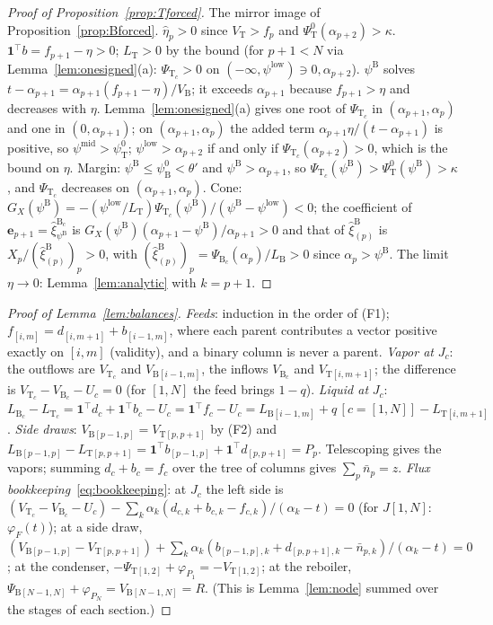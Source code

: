 \documentclass[11pt,a4paper]{report}
\newcommand{\one}{\mathbf 1}
\newcommand{\bfe}{\mathbf e}
\newcommand{\Ts}{\mathrm T}
\newcommand{\Bs}{\mathrm B}
\begin{document}
\begin{proof}[Proof of Proposition~\ref{prop:Tforced}]
The mirror image of Proposition~\ref{prop:Bforced}. \(\hat\eta_p>0\) since \(V_\Ts>f_p\) and \(\Psi^0_\Ts(\alpha_{p+2})>\kappa\).
\(\one^\top b=f_{p+1}-\eta>0\); \(L_\Ts>0\) by the bound (for \(p+1<N\) via Lemma~\ref{lem:onesigned}(a): \(\Psi_{\Ts_c}>0\) on
\((-\infty,\psi^{\mathrm{low}})\ni0,\alpha_{p+2}\)). \(\psi^\Bs\) solves \(t-\alpha_{p+1}=\alpha_{p+1}(f_{p+1}-\eta)/V_\Bs\); it exceeds \(\alpha_{p+1}\)
because \(f_{p+1}>\eta\) and decreases with \(\eta\). Lemma~\ref{lem:onesigned}(a) gives one root of \(\Psi_{\Ts_c}\) in \((\alpha_{p+1},\alpha_p)\) and one
in \((0,\alpha_{p+1})\); on \((\alpha_{p+1},\alpha_p)\) the added term \(\alpha_{p+1}\eta/(t-\alpha_{p+1})\) is positive, so \(\psi^{\mathrm{mid}}>\psi^0_\Ts\);
\(\psi^{\mathrm{low}}>\alpha_{p+2}\) if and only if \(\Psi_{\Ts_c}(\alpha_{p+2})>0\), which is the bound on \(\eta\). Margin: \(\psi^\Bs\le\psi^0_\Bs<\theta'\)
and \(\psi^\Bs>\alpha_{p+1}\), so \(\Psi_{\Ts_c}(\psi^\Bs)>\Psi^0_\Ts(\psi^\Bs)>\kappa\), and \(\Psi_{\Ts_c}\) decreases on \((\alpha_{p+1},\alpha_p)\). Cone:
\(G_X(\psi^\Bs)=-(\psi^{\mathrm{low}}/L_\Ts)\Psi_{\Ts_c}(\psi^\Bs)/(\psi^\Bs-\psi^{\mathrm{low}})<0\); the coefficient of \(\bfe_{p+1}=\hat\xi^{\Bs_c}_{\psi^\Bs}\)
is \(G_X(\psi^\Bs)(\alpha_{p+1}-\psi^\Bs)/\alpha_{p+1}>0\) and that of \(\hat\xi^\Bs_{(p)}\) is \(X_p/(\hat\xi^\Bs_{(p)})_p>0\), with
\((\hat\xi^\Bs_{(p)})_p=\Psi_{\Bs_c}(\alpha_p)/L_\Bs>0\) since \(\alpha_p>\psi^\Bs\). The limit \(\eta\to0\): Lemma~\ref{lem:analytic} with \(k=p+1\).
\end{proof}

\begin{proof}[Proof of Lemma~\ref{lem:balances}]
\emph{Feeds}: induction in the order of (F1); \(f_{[i,m]}=d_{[i,m+1]}+b_{[i-1,m]}\), where each parent contributes a vector positive
exactly on \([i,m]\) (validity), and a binary column is never a parent. \emph{Vapor at} \(J_c\): the outflows are \(V_{\Ts_c}\) and
\(V_{\Bs[i-1,m]}\), the inflows \(V_{\Bs_c}\) and \(V_{\Ts[i,m+1]}\); the difference is \(V_{\Ts_c}-V_{\Bs_c}-U_c=0\) (for \([1,N]\) the feed brings
\(1-q\)). \emph{Liquid at} \(J_c\): \(L_{\Bs_c}-L_{\Ts_c}=\one^\top d_c+\one^\top b_c-U_c=\one^\top f_c-U_c=L_{\Bs[i-1,m]}+q\,[c=[1,N]]-L_{\Ts[i,m+1]}\).
\emph{Side draws}: \(V_{\Bs[p-1,p]}=V_{\Ts[p,p+1]}\) by (F2) and \(L_{\Bs[p-1,p]}-L_{\Ts[p,p+1]}=\one^\top b_{[p-1,p]}+\one^\top d_{[p,p+1]}=P_p\).
Telescoping gives the vapors; summing \(d_c+b_c=f_c\) over the tree of columns gives \(\sum_p\bar n_p=z\).
\emph{Flux bookkeeping}~\eqref{eq:bookkeeping}: at \(J_c\) the left side is
\((V_{\Ts_c}-V_{\Bs_c}-U_c)-\sum_k\alpha_k(d_{c,k}+b_{c,k}-f_{c,k})/(\alpha_k-t)=0\) (for \(J[1,N]\): \(\varphi_F(t)\)); at a side draw,
\((V_{\Bs[p-1,p]}-V_{\Ts[p,p+1]})+\sum_k\alpha_k(b_{[p-1,p],k}+d_{[p,p+1],k}-\bar n_{p,k})/(\alpha_k-t)=0\); at the condenser,
\(-\Psi_{\Ts[1,2]}+\varphi_{P_1}=-V_{\Ts[1,2]}\); at the reboiler, \(\Psi_{\Bs[N-1,N]}+\varphi_{P_N}=V_{\Bs[N-1,N]}=R\). (This is
Lemma~\ref{lem:node} summed over the stages of each section.)
\end{proof}
\end{document}
